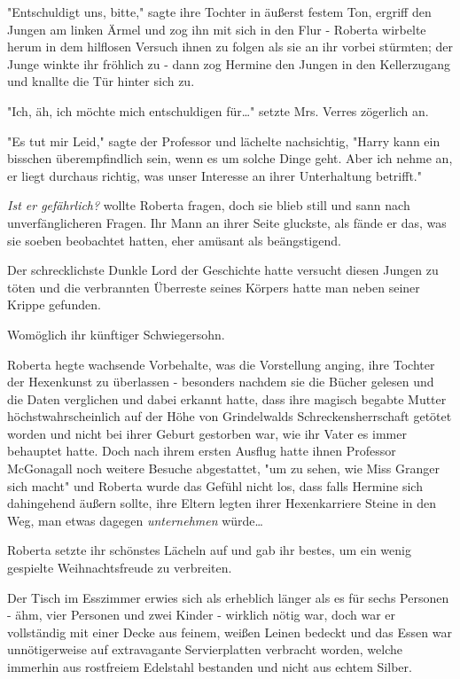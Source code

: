{"Entschuldigt uns, bitte," sagte ihre Tochter in äußerst festem Ton, ergriff den Jungen am linken Ärmel und zog ihn mit sich in den Flur - Roberta wirbelte herum in dem hilflosen Versuch ihnen zu folgen als sie an ihr vorbei stürmten; der Junge winkte ihr fröhlich zu - dann zog Hermine den Jungen in den Kellerzugang und knallte die Tür hinter sich zu.

"Ich, äh, ich möchte mich entschuldigen für…" setzte Mrs. Verres zögerlich an.

"Es tut mir Leid," sagte der Professor und lächelte nachsichtig, "Harry kann ein bisschen überempfindlich sein, wenn es um solche Dinge geht. Aber ich nehme an, er liegt durchaus richtig, was unser Interesse an ihrer Unterhaltung betrifft."

\emph{Ist er gefährlich?} wollte Roberta fragen, doch sie blieb still und sann nach unverfänglicheren Fragen. Ihr Mann an ihrer Seite gluckste, als fände er das, was sie soeben beobachtet hatten, eher amüsant als beängstigend.

Der schrecklichste Dunkle Lord der Geschichte hatte versucht diesen Jungen zu töten und die verbrannten Überreste seines Körpers hatte man neben seiner Krippe gefunden.

Womöglich ihr künftiger Schwiegersohn.

Roberta hegte wachsende Vorbehalte, was die Vorstellung anging, ihre Tochter der Hexenkunst zu überlassen - besonders nachdem sie die Bücher gelesen und die Daten verglichen und dabei erkannt hatte, dass ihre magisch begabte Mutter höchstwahrscheinlich auf der Höhe von Grindelwalds Schreckensherrschaft getötet worden und nicht bei ihrer Geburt gestorben war, wie ihr Vater es immer behauptet hatte. Doch nach ihrem ersten Ausflug hatte ihnen Professor McGonagall noch weitere Besuche abgestattet, "um zu sehen, wie Miss Granger sich macht" und Roberta wurde das Gefühl nicht los, dass falls Hermine sich dahingehend äußern sollte, ihre Eltern legten ihrer Hexenkarriere Steine in den Weg, man etwas dagegen \emph{unternehmen} würde…

Roberta setzte ihr schönstes Lächeln auf und gab ihr bestes, um ein wenig gespielte Weihnachtsfreude zu verbreiten.

\later

Der Tisch im Esszimmer erwies sich als erheblich länger als es für sechs Personen - ähm, vier Personen und zwei Kinder - wirklich nötig war, doch war er vollständig mit einer Decke aus feinem, weißen Leinen bedeckt und das Essen war unnötigerweise auf extravagante Servierplatten verbracht worden, welche immerhin aus rostfreiem Edelstahl bestanden und nicht aus echtem Silber.

}
